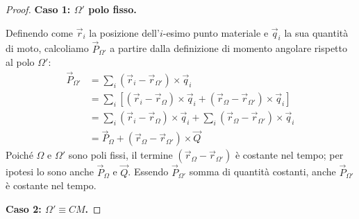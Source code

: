 \documentclass[11pt, a4paper, openright]{book}
\theoremstyle{plain}
\theoremstyle{definition}
\begin{document}
\begin{proof}
\textbf{Caso 1: $\Omega'$ polo fisso.}

Definendo come $\vec{r}_i$ la posizione dell'$i$-esimo punto materiale e $\vec{q}_i$ la sua quantità di moto, calcoliamo $\vec{P}_{\Omega'}$ a partire dalla definizione di momento angolare rispetto al polo $\Omega'$:
\begin{align}
    \vec{P}_{\Omega'} & = \sum_i (\vec{r}_i - \vec{r}_{\Omega'}) \times \vec{q}_i \\
    & = \sum_i \left[(\vec{r}_i - \vec{r}_\Omega) \times \vec{q}_i + (\vec{r}_\Omega - \vec{r}_{\Omega'}) \times \vec{q}_i\right] \\
    & = \sum_i (\vec{r}_i - \vec{r}_\Omega) \times \vec{q}_i + \sum_i (\vec{r}_\Omega - \vec{r}_{\Omega'}) \times \vec{q}_i \\
    & = \vec{P}_\Omega + (\vec{r}_\Omega - \vec{r}_{\Omega'}) \times \vec{Q}
\end{align}
    Poiché $\Omega$ e $\Omega'$ sono poli fissi, il termine $(\vec{r}_\Omega - \vec{r}_{\Omega'})$ è costante nel tempo; per ipotesi lo sono anche $\vec{P}_\Omega$ e $\vec{Q}$. Essendo $\vec{P}_{\Omega'}$ somma di quantità costanti, anche $\vec{P}_{\Omega'}$ è costante nel tempo.

\textbf{Caso 2: $\Omega' \equiv CM$.}


\end{proof}
\end{document}
